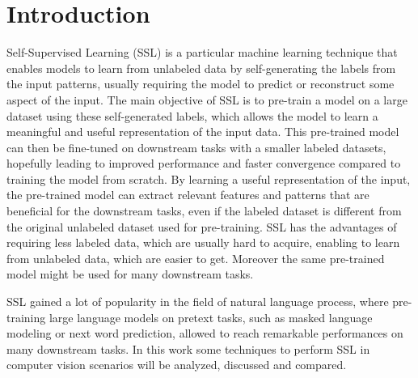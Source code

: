 \documentclass[12pt]{article}
\begin{document}
	\section{Introduction}
	Self-Supervised Learning (SSL) is a particular machine learning technique that enables models to learn from unlabeled data by self-generating the labels from the input patterns, usually requiring the model to predict or reconstruct some aspect of the input. The main objective of SSL is to pre-train a model on a large dataset using these self-generated labels, which allows the model to learn a meaningful and useful representation of the input data. This pre-trained model can then be fine-tuned on downstream tasks with a smaller labeled datasets, hopefully leading to improved performance and faster convergence compared to training the model from scratch. By learning a useful representation of the input, the pre-trained model can extract relevant features and patterns that are beneficial for the downstream tasks, even if the labeled dataset is different from the original unlabeled dataset used for pre-training. SSL has the advantages of requiring less labeled data, which are usually hard to acquire, enabling to learn from unlabeled data, which are easier to get. Moreover the same pre-trained model might be used for many downstream tasks. 
	
	SSL gained a lot of popularity in the field of natural language process, where pre-training large language models on pretext tasks, such as masked language modeling or next word prediction, allowed to reach remarkable performances on many downstream tasks. In this work some techniques to perform SSL in computer vision scenarios will be analyzed, discussed and compared.
	
\end{document}
